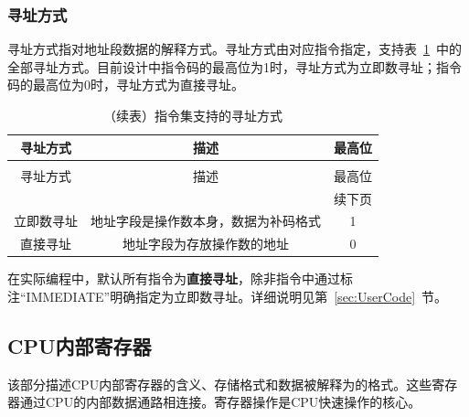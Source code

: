 \documentclass[lang=cn,a4paper,newtx]{elegantpaper}
\begin{document}
\subsubsection{寻址方式}
寻址方式指对地址段数据的解释方式。寻址方式由对应指令指定，支持表~\ref{tab:ISA:addressingmode}~中的全部寻址方式。目前设计中指令码的最高位为1时，寻址方式为立即数寻址；指令码的最高位为0时，寻址方式为直接寻址。


\begin{longtable}{c c c}
  \caption{指令集支持的寻址方式} \label{tab:ISA:addressingmode} \\
  \toprule
  寻址方式  & 描述 & 最高位\\
  \midrule
  \endfirsthead
  
  \caption[]{（续表）指令集支持的寻址方式} \\
  \toprule
  寻址方式  & 描述 & 最高位\\
  \midrule
  \endhead
  
  \midrule
  \multicolumn{3}{r}{续下页} \\
  \midrule
  \endfoot
  
  \bottomrule
  \endlastfoot
  
  立即数寻址   &  地址字段是操作数本身，数据为补码格式  & 1\\
  直接寻址 &  地址字段为存放操作数的地址    & 0\\
\end{longtable}

在实际编程中，默认所有指令为\textbf{直接寻址}，除非指令中通过标注“IMMEDIATE”明确指定为立即数寻址。详细说明见第~\ref{sec:UserCode}~节。
\subsection{CPU内部寄存器}
该部分描述CPU内部寄存器的含义、存储格式和数据被解释为的格式。这些寄存器通过CPU的内部数据通路相连接。寄存器操作是CPU快速操作的核心。
\end{document}
